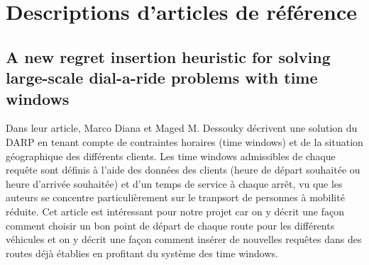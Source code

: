 \documentclass[11pt,a4paper]{report}
\begin{document}

\section*{Descriptions d'articles de référence}
\subsection*{A new regret insertion heuristic for solving large-scale
dial-a-ride problems with time windows} 
 Dans leur article, Marco Diana et Maged M. Dessouky décrivent une solution du DARP en tenant compte de contraintes horaires (time windows) et de la situation géographique des différents clients. Les time windows admissibles de chaque requête sont définis à l'aide des données des clients (heure de départ souhaitée ou heure d'arrivée souhaitée) et d'un temps de service à chaque arrêt, vu que les auteurs se concentre particulièrement sur le tranpsort de personnes à mobilité réduite. Cet article est  intéressant pour notre projet car on y décrit une façon comment choisir un bon point de départ de chaque route pour les différents véhicules et on y décrit une façon comment insérer de nouvelles requêtes dans des routes déjà établies en profitant du système des time windows.
\end{document}
